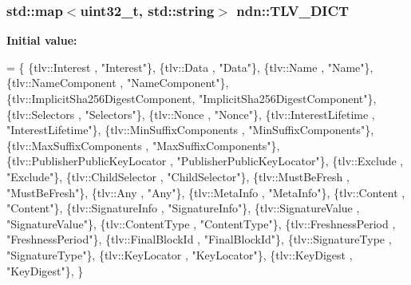 \begin{DoxyVerb}
\subsubsection[{\texorpdfstring{T\+L\+V\+\_\+\+D\+I\+CT}{TLV\_DICT}}]{\setlength{\rightskip}{0pt plus 5cm}std\+::map$<$uint32\+\_\+t, std\+::string$>$ ndn\+::\+T\+L\+V\+\_\+\+D\+I\+CT}\hypertarget{namespacendn_a187ce53546ae886c2a18ec36e1e142fd}{}\label{namespacendn_a187ce53546ae886c2a18ec36e1e142fd}
{\bfseries Initial value\+:}
\begin{DoxyCode}
= \{
  \{tlv::Interest                     , \textcolor{stringliteral}{"Interest"}\},
  \{tlv::Data                         , \textcolor{stringliteral}{"Data"}\},
  \{tlv::Name                         , \textcolor{stringliteral}{"Name"}\},
  \{tlv::NameComponent                , \textcolor{stringliteral}{"NameComponent"}\},
  \{tlv::ImplicitSha256DigestComponent, \textcolor{stringliteral}{"ImplicitSha256DigestComponent"}\},
  \{tlv::Selectors                    , \textcolor{stringliteral}{"Selectors"}\},
  \{tlv::Nonce                        , \textcolor{stringliteral}{"Nonce"}\},
  \{tlv::InterestLifetime             , \textcolor{stringliteral}{"InterestLifetime"}\},
  \{tlv::MinSuffixComponents          , \textcolor{stringliteral}{"MinSuffixComponents"}\},
  \{tlv::MaxSuffixComponents          , \textcolor{stringliteral}{"MaxSuffixComponents"}\},
  \{tlv::PublisherPublicKeyLocator    , \textcolor{stringliteral}{"PublisherPublicKeyLocator"}\},
  \{tlv::Exclude                      , \textcolor{stringliteral}{"Exclude"}\},
  \{tlv::ChildSelector                , \textcolor{stringliteral}{"ChildSelector"}\},
  \{tlv::MustBeFresh                  , \textcolor{stringliteral}{"MustBeFresh"}\},
  \{tlv::Any                          , \textcolor{stringliteral}{"Any"}\},
  \{tlv::MetaInfo                     , \textcolor{stringliteral}{"MetaInfo"}\},
  \{tlv::Content                      , \textcolor{stringliteral}{"Content"}\},
  \{tlv::SignatureInfo                , \textcolor{stringliteral}{"SignatureInfo"}\},
  \{tlv::SignatureValue               , \textcolor{stringliteral}{"SignatureValue"}\},
  \{tlv::ContentType                  , \textcolor{stringliteral}{"ContentType"}\},
  \{tlv::FreshnessPeriod              , \textcolor{stringliteral}{"FreshnessPeriod"}\},
  \{tlv::FinalBlockId                 , \textcolor{stringliteral}{"FinalBlockId"}\},
  \{tlv::SignatureType                , \textcolor{stringliteral}{"SignatureType"}\},
  \{tlv::KeyLocator                   , \textcolor{stringliteral}{"KeyLocator"}\},
  \{tlv::KeyDigest                    , \textcolor{stringliteral}{"KeyDigest"}\},
\}
\end{DoxyCode}



\end{DoxyVerb}
